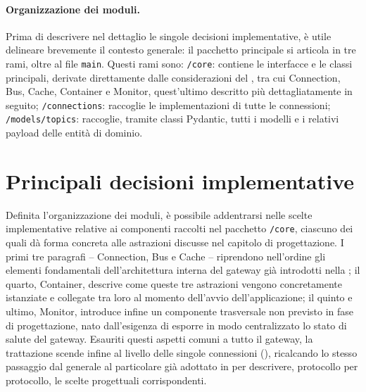 \paragraph{Organizzazione dei moduli.}
Prima di descrivere nel dettaglio le singole decisioni implementative, è utile delineare brevemente il contesto generale: il pacchetto principale si articola in tre rami, oltre al file \texttt{main}. Questi rami sono: \texttt{/core}: contiene le interfacce e le classi principali, derivate direttamente dalle considerazioni del , tra cui Connection, Bus, Cache, Container e Monitor, quest'ultimo descritto più dettagliatamente in seguito; \texttt{/connections}: raccoglie le implementazioni di tutte le connessioni; \texttt{/models/topics}: raccoglie, tramite classi Pydantic, tutti i modelli e i relativi payload delle entità di dominio.

%
\section{Principali decisioni implementative}
\label{sec:principali-decisioni-implementative}
%
Definita l'organizzazione dei moduli, è possibile addentrarsi nelle scelte implementative relative ai componenti raccolti nel pacchetto \texttt{/core}, ciascuno dei quali dà forma concreta alle astrazioni discusse nel capitolo di progettazione. I primi tre paragrafi -- Connection, Bus e Cache -- riprendono nell'ordine gli elementi fondamentali dell'architettura interna del gateway già introdotti nella ; il quarto, Container, descrive come queste tre astrazioni vengono concretamente istanziate e collegate tra loro al momento dell'avvio dell'applicazione; il quinto e ultimo, Monitor, introduce infine un componente trasversale non previsto in fase di progettazione, nato dall'esigenza di esporre in modo centralizzato lo stato di salute del gateway. Esauriti questi aspetti comuni a tutto il gateway, la trattazione scende infine al livello delle singole connessioni (), ricalcando lo stesso passaggio dal generale al particolare già adottato in  per descrivere, protocollo per protocollo, le scelte progettuali corrispondenti.

